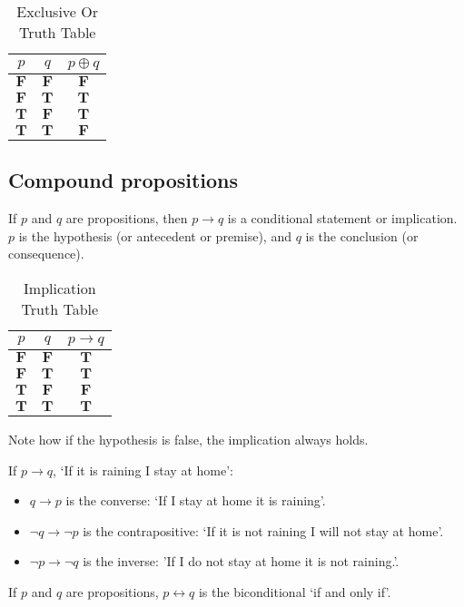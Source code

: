 \begin{table}[htbp]
    \centering
    \begin{tabular}{ccc}
        \toprule
        \(p\)          & \(q\)          & \(p \oplus q\) \\
        \midrule
        \(\mathbf{F}\) & \(\mathbf{F}\) & \(\mathbf{F}\) \\
        \(\mathbf{F}\) & \(\mathbf{T}\) & \(\mathbf{T}\) \\
        \(\mathbf{T}\) & \(\mathbf{F}\) & \(\mathbf{T}\) \\
        \(\mathbf{T}\) & \(\mathbf{T}\) & \(\mathbf{F}\) \\
        \bottomrule
    \end{tabular}
    \caption{Exclusive Or Truth Table}
\end{table}

\subsection{Compound propositions}
If \(p\) and \(q\) are propositions, then \(p \rightarrow q\) is a conditional statement or implication. \(p\) is the hypothesis (or antecedent or premise), and \(q\) is the conclusion (or consequence).

\begin{table}[htbp]
    \centering
    \begin{tabular}{ccc}
        \toprule
        \(p\)          & \(q\)          & \(p \rightarrow q\) \\
        \midrule
        \(\mathbf{F}\) & \(\mathbf{F}\) & \(\mathbf{T}\)      \\
        \(\mathbf{F}\) & \(\mathbf{T}\) & \(\mathbf{T}\)      \\
        \(\mathbf{T}\) & \(\mathbf{F}\) & \(\mathbf{F}\)      \\
        \(\mathbf{T}\) & \(\mathbf{T}\) & \(\mathbf{T}\)      \\
        \bottomrule
    \end{tabular}
    \caption{Implication Truth Table}
\end{table}

Note how if the hypothesis is false, the implication always holds.

If \(p \rightarrow q\), `If it is raining I stay at home':
\begin{itemize}
    \item \(q \rightarrow p\) is the converse: `If I stay at home it is raining'.
    \item \(\neg q \rightarrow \neg p\) is the contrapositive: `If it is not raining I will not stay at home'.
    \item \(\neg p \rightarrow \neg q\) is the inverse: 'If I do not stay at home it is not raining.'.
\end{itemize}
If \(p\) and \(q\) are propositions, \(p \leftrightarrow  q\) is the biconditional `if and only if'.

